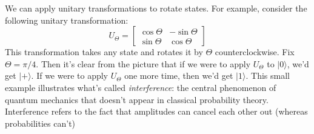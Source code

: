 \documentclass[12pt]{report}
\theoremstyle{plain}
\theoremstyle{definition}
\renewcommand{\ket}[1]{|#1\rangle}
\begin{document}
We can apply unitary transformations to rotate states. For example, consider the following unitary transformation:
\[
U_\Theta =
\begin{bmatrix}
\cos \Theta & - \sin \Theta \\
\sin \Theta & \cos \Theta
\end{bmatrix}
\]
This transformation takes any state and rotates it by $\Theta$ counterclockwise. Fix $\Theta = \pi/4$. Then it's clear from the picture that if we were to apply $U_\Theta$ to $\ket{0}$, we'd get $\ket{+}$. If we were to apply $U_\Theta$ one more time, then we'd get $\ket{1}$. This small example illustrates what's called \emph{interference}: the central phenomenon of quantum mechanics that doesn't appear in classical probability theory.  Interference refers to the fact that amplitudes can cancel each other out (whereas probabilities can't)
\end{document}
